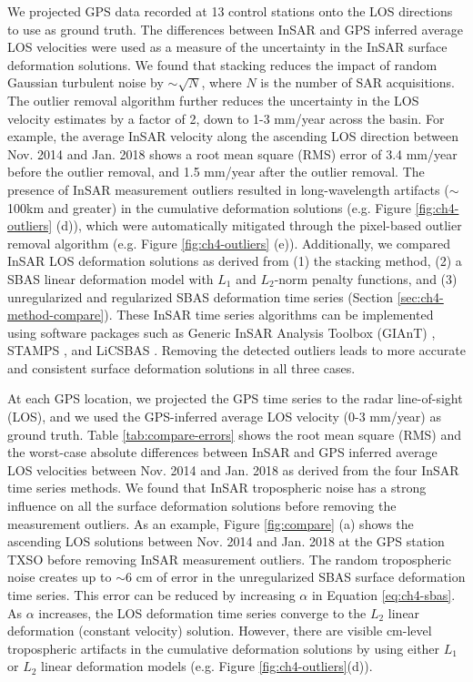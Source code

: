 We projected GPS data recorded at 13 control stations onto the LOS directions to use as ground truth. The differences between InSAR and GPS inferred average LOS velocities were used as a measure of the uncertainty in the InSAR surface deformation solutions. 
We found that stacking reduces the impact of random Gaussian turbulent noise by $ \sim \sqrt{N} $, where $ N $ is the number of SAR acquisitions. The outlier removal algorithm further reduces the uncertainty in the LOS velocity estimates by a factor of 2, down to 1-3 mm/year across the basin. For example, the average InSAR velocity along the ascending LOS direction between Nov. 2014 and Jan. 2018 shows a root mean square (RMS) error of 3.4 mm/year before the outlier removal, and 1.5 mm/year after the outlier removal. The presence of InSAR measurement outliers resulted in long-wavelength artifacts ($ \sim $100km and greater) in the cumulative deformation solutions (e.g. Figure \ref{fig:ch4-outliers} (d)), which were automatically mitigated through the pixel-based outlier removal algorithm (e.g. Figure \ref{fig:ch4-outliers} (e)). Additionally, we compared InSAR LOS deformation solutions as derived from (1) the stacking method, (2) a SBAS linear deformation model with $L_1$ and $L_2$-norm penalty functions, and (3) unregularized and regularized SBAS deformation time series (Section \ref{sec:ch4-method-compare}). These InSAR time series algorithms can be implemented using software packages such as Generic InSAR Analysis Toolbox (GIAnT) \citep{Agram2013NewRadarInterferometric}, STAMPS \citep{Hooper2012RecentAdvancesSar}, and LiCSBAS \citep{Morishita2020LicsbasOpenSource}. Removing the detected outliers leads to more accurate and consistent surface deformation solutions in all three cases. 



At each GPS location, we projected the GPS time series to the radar line-of-sight (LOS), and we used the GPS-inferred average LOS velocity (0-3 mm/year) as ground truth. Table \ref{tab:compare-errors} shows the root mean square (RMS) and the worst-case absolute differences between InSAR and GPS inferred average LOS velocities between Nov. 2014 and Jan. 2018 as derived from the four InSAR time series methods. We found that InSAR tropospheric noise has a strong influence on all the surface deformation solutions before removing the measurement outliers. As an example, Figure \ref{fig:compare} (a) shows the ascending LOS solutions between Nov. 2014 and Jan. 2018 at the GPS station TXSO before removing InSAR measurement outliers. The random tropospheric noise creates up to $\sim$6 cm of error in the unregularized SBAS surface deformation time series. This error can be reduced by increasing $ \alpha$ in Equation \eqref{eq:ch4-sbas}. As $\alpha$ increases, the LOS deformation time series converge to the $L_2$ linear deformation (constant velocity) solution. However, there are visible cm-level tropospheric artifacts in the cumulative deformation solutions by using either $L_1$ or $L_2$ linear deformation models (e.g. Figure \ref{fig:ch4-outliers}(d)).   



